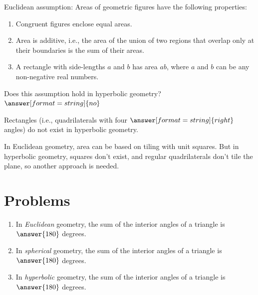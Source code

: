 \documentclass{ximera}
\begin{document}
\begin{problem} %
Euclidean assumption:  Areas of geometric figures have the following properties: 
\begin{enumerate}
\item Congruent figures enclose equal areas.
\item Area is additive, i.e., the area of the union of two regions that overlap only at their boundaries is the sum of their areas. 
\item A rectangle with side-lengths $a$ and $b$ has area $ab$, where $a$ and $b$ can be any non-negative real numbers.
\end{enumerate}

Does this assumption hold in hyperbolic geometry? 
$\answer[format=string]{no}$
\begin{problem}
Rectangles (i.e., quadrilaterals with four $\answer[format=string]{right}$ angles) do not exist in hyperbolic geometry.    

In Euclidean geometry, area can be based on tiling with unit squares.  But in hyperbolic geometry, squares don't exist, and regular quadrilaterals don't tile the plane, so another approach is needed. 
\end{problem}
\end{problem}

\section*{Problems}

\begin{problem}
\begin{enumerate}
\item In \emph{Euclidean} geometry, the sum of the interior angles of a triangle is 
$\answer{180}$ degrees.
\item In \emph{spherical} geometry, the sum of the interior angles of a triangle is 
$\answer{180}$ degrees.
\item In \emph{hyperbolic} geometry, the sum of the interior angles of a triangle is 
$\answer{180}$ degrees.
\end{enumerate}
\end{problem}
\end{document}
